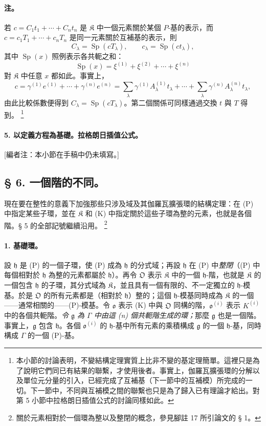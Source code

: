 \documentclass[11pt]{article}
\providecommand{\srcfn}[2]{%
  \begingroup
  \renewcommand{\thefootnote}{#1}%
  \footnote{#2}%
  \addtocounter{footnote}{-1}%
  \endgroup}
\begin{document}
\paragraph{注。}
若 $c=C_1t_1+\cdots+C_nt_n$ 是 $\mathfrak K$ 中一個元素關於某個 $P$-基的表示，而 $c=c_1T_1+\cdots+c_nT_n$ 是同一元素關於互補基的表示，則
\[
C_\lambda=\operatorname{Sp}(cT_\lambda),
\qquad c_\lambda=\operatorname{Sp}(ct_\lambda),
\]
其中 $\operatorname{Sp}(x)$ 照例表示各共軛之和：
\[
\operatorname{Sp}(x)=\xi^{(1)}+\xi^{(2)}+\cdots+\xi^{(n)}
\]
對 $\mathfrak K$ 中任意 $x$ 都如此。事實上，
\[
c=\gamma^{(1)}e^{(1)}+\cdots+\gamma^{(n)}e^{(n)}
=\sum_\lambda\gamma^{(1)}A_\lambda^{(1)}t_\lambda+
\cdots+\sum_\lambda\gamma^{(n)}A_\lambda^{(n)}t_\lambda,
\]
由此比較係數便得到 $C_\lambda=\operatorname{Sp}(cT_\lambda)$。第二個關係可同樣通過交換 $t$ 與 $T$ 得到。\srcfn{19)}{本小節的討論表明，不變結構定理實質上比非不變的基定理簡單。這裡只是為了說明它們同已有結果的聯繫，才使用後者。事實上，伽羅瓦擴張環的分解以及單位元分量的引入，已經完成了互補基（下一節中的互補模）所完成的一切。下一節中，不同與互補模之間的聯繫也只是為了歸入已有理論才給出。對第 5 小節中拉格朗日插值公式的討論同樣如此。}

\paragraph{5. 以定義方程為基礎。拉格朗日插值公式。}
[編者注：本小節在手稿中仍未填寫。]
\subsection*{\S{} 6. 一個階的不同。}

現在要在整性的意義下加強那些只涉及域及其伽羅瓦擴張環的結構定理：在 (P) 中指定某些子環，並在 \(\mathfrak K\) 和 (K) 中指定關於這些子環為整的元素，也就是各個階。§ 5 的全部記號繼續沿用。\srcfn{20)}{關於元素相對於一個環為整以及整閉的概念，參見腳註 17 所引論文的 § 1。}

\paragraph{1. 基礎環。}
設 \(\mathfrak h\) 是 (P) 的一個子環，使 (P) 成為 \(\mathfrak h\) 的分式域；再設 \(\mathfrak h\) 在 (P) 中\emph{整閉}（(P) 中每個相對於 \(\mathfrak h\) 為整的元素都屬於 \(\mathfrak h\)）。再令 \(\mathfrak O\) 表示 \(\mathfrak K\) 中的一個 \(\mathfrak h\)-階，也就是 \(\mathfrak K\) 的一個包含 \(\mathfrak h\) 的子環，其分式域為 \(\mathfrak K\)，並且具有一個有限的、不一定獨立的 \(\mathfrak h\)-模基。於是 \(\mathfrak O\) 的所有元素都是（相對於 \(\mathfrak h\)）整的；這個 \(\mathfrak h\)-模基同時成為 \(\mathfrak K\) 的一個——通常相關的——(P)-模基。令 \(\mathfrak o\) 表示 (K) 中與 \(\mathfrak O\) 同構的階，\(\mathfrak o^{(i)}\) 表示 \(K^{(i)}\) 中的各個共軛階。\emph{令 \(\mathfrak g\) 為 \(\Gamma\) 中由這 (n) 個共軛階生成的環；}那麼 \(\mathfrak g\) 也是一個階。事實上，\(\mathfrak g\) 包含 \(\mathfrak h\)。各個 \(\mathfrak o^{(i)}\) 的 \(\mathfrak h\)-基中所有元素的乘積構成 \(\mathfrak g\) 的一個 \(\mathfrak h\)-基，同時構成 \(\Gamma\) 的一個 (P)-基。
\end{document}
